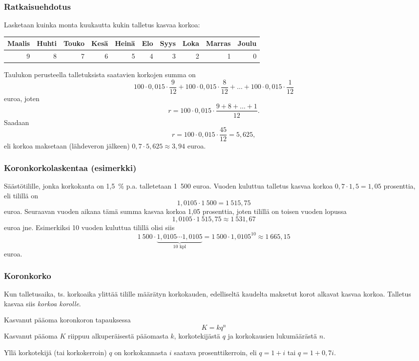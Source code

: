 \documentclass{article}\usepackage[]{graphicx}\usepackage[]{color}
\theoremstyle{remark}
\newtheorem{ratkaisu}{Ratkaisuehdotus}
\begin{document}
\begin{frame}
    \frametitle{Ratkaisuehdotus}
    Lasketaan kuinka monta kuukautta kukin talletus kasvaa korkoa:
    \begin{scriptsize}
\begin{table}[ht]
\centering
\begin{tabular}{rrrrrrrrrr}
  \hline
Maalis & Huhti & Touko & Kesä & Heinä & Elo & Syys & Loka & Marras & Joulu \\ 
  \hline
  9 &   8 &   7 &   6 &   5 &   4 &   3 &   2 &   1 &   0 \\ 
   \hline
\end{tabular}
\end{table}

    \end{scriptsize}
    \pause Taulukon perusteella talletuksista saatavien korkojen summa on
    \[
        100\cdot0,015\cdot\frac{9}{12}+100\cdot0,015\cdot\frac{8}{12}+\ldots+100\cdot0,015\cdot\frac{1}{12}
    \]
    euroa\pause, joten
    \[
        r =  100\cdot0,015\cdot\frac{9+8 +\dots+1}{12}.
    \]
    \pause Saadaan
    \[
        r = 100\cdot0,015\cdot\frac{45}{12} = 5{,}625,
    \]
    eli korkoa maksetaan (lähdeveron jälkeen) \(0,7\cdot5{,}625 \approx 3{,}94\) euroa.
\end{frame}

\begin{frame}
    \frametitle{Koronkorkolaskentaa (esimerkki)}
    \pause
    Säästötilille, jonka korkokanta on 1,5~\% p.a. talletetaan 1~500 euroa. \pause Vuoden kuluttua talletus kasvaa korkoa \(0,7\cdot 1,5 = 1{,}05\) prosenttia\pause, eli tilillä on 
    \[
        1{,}0105\cdot1~500 = 1~515{,}75
    \]
    euroa. \pause Seuraavan vuoden aikana tämä summa kasvaa korkoa 1{,}05 prosenttia, joten tilillä on toisen vuoden lopussa
    \[
        1{,}0105\cdot1~515{,}75 \approx 1~531{,}67
    \]
    euroa jne. \pause Esimerkiksi 10 vuoden kuluttua tilillä olisi siis
    \[
        1~500\cdot\underbrace{1{,}0105\cdots1{,}0105}_{10\text{ kpl}} = 1~500\cdot1{,}0105^{10} \approx 1~665{,}15
    \]
    euroa.
\end{frame}

\begin{frame}
    \frametitle{Koronkorko}
    \pause
    Kun talletusaika, ts. korkoaika ylittää tilille määrätyn korkokauden, edelliseltä kaudelta maksetut korot alkavat kasvaa korkoa. 
    \pause
    Talletus kasvaa siis \emph{korkoa korolle}.
    \pause
    \begin{block}{Kasvanut pääoma koronkoron tapauksessa}
        \[
            K = kq^n
        \]
        Kasvanut pääoma \(K\) riippuu alkuperäisestä pääomasta \(k\), korkotekijästä \(q\) ja korkokausien lukumäärästä \(n\).
    \end{block}
    Yllä korkotekijä (tai korkokerroin) \(q\) on korkokannasta \(i\) saatava prosenttikerroin, eli \(q = 1+i\) tai \(q = 1 + 0,7i\).
\end{frame}
\end{document}
